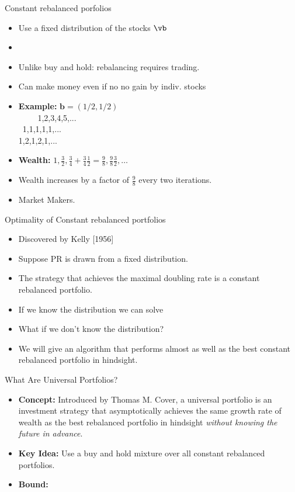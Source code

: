 \documentclass{beamer}
\begin{document}
\begin{small}
\begin{frame}{Constant rebalanced porfolios}
    \begin{itemize}
    \item Use a fixed distribution of the stocks $\vb$
    \item {}
    \item Unlike buy and hold: rebalancing requires trading.
    \item Can make money even if no no gain by indiv. stocks  
    \item {\bf Example:}  $\mathbf{b}=(1/2,1/2)$\\
      ~~~~ 1,2,3,4,5,... \\
       ~1,1,1,1,1,... \\
       1,2,1,2,1,...
    \item {\bf Wealth:}  $1,\frac{3}{2},\frac{3}{4}+\frac{3}{4}\frac{1}{2}=\frac{9}{8},\frac{9}{8}\frac{3}{2},\ldots$
    \item Wealth increases by a factor of $\frac{9}{8}$ every two iterations.
    \item Market Makers.
    \end{itemize}
\end{frame}

\begin{frame}{Optimality of Constant rebalanced portfolios}
        \begin{itemize}
        \item Discovered by Kelly [1956]
        \item Suppose PR \R{$\vx$} is drawn from a fixed distribution.
        \item The strategy that achieves the maximal doubling rate is a constant rebalanced portfolio.
        \item If we know the distribution we can solve 
        \item What if we don't know the distribution?
        \item We will give an algorithm that performs almost as well as the best constant rebalanced portfolio in hindsight.
        \end{itemize}
\end{frame}

\begin{frame}{What Are Universal Portfolios?}
  \begin{itemize}
  \item \textbf{Concept:} Introduced by Thomas M. Cover, a universal portfolio is an investment strategy 
    that asymptotically achieves the same growth rate of wealth as the best rebalanced portfolio in 
    hindsight \emph{without knowing the future in advance}.
  \item \textbf{Key Idea:} Use a buy and hold mixture over all constant rebalanced portfolios.
    \item \textbf{Bound:} 
  \end{itemize}
\end{frame}


\end{small}
\end{document}
